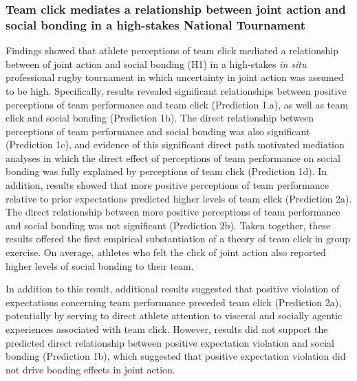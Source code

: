 \subsubsection{Team click mediates a relationship between joint action and social bonding in a high-stakes National Tournament}
Findings showed that athlete perceptions of team click mediated a relationship between of joint action and social bonding (H1) in a high-stakes \textit{in situ} professional rugby tournament in which uncertainty in joint action was assumed to be high.  Specifically, results revealed significant relationships between positive perceptions of team performance and team click (Prediction 1.a), as well as team click and social bonding (Prediction 1b).  The direct relationship between perceptions of team performance and social bonding was also significant (Prediction 1c), and evidence of this significant direct path motivated mediation analyses in which the direct effect of perceptions of team performance on social bonding was fully explained by perceptions of team click (Prediction 1d).  In addition, results showed that more positive perceptions of team performance relative to prior expectations predicted higher levels of team click (Prediction 2a).  The direct relationship between more positive perceptions of team performance and social bonding was not significant (Prediction 2b).  Taken together, these results offered the first empirical substantiation of a theory of team click in group exercise. On average, athletes who felt the click of joint action also reported higher levels of social bonding to their team.

In addition to this result, additional results suggested that positive violation of expectations concerning team performance preceded team click (Prediction 2a), potentially by serving to direct athlete attention to visceral and socially agentic experiences associated with team click.  However, results did not support the predicted direct relationship between positive expectation violation and social bonding (Prediction 1b), which suggested that positive expectation violation did not drive bonding effects in joint action.


